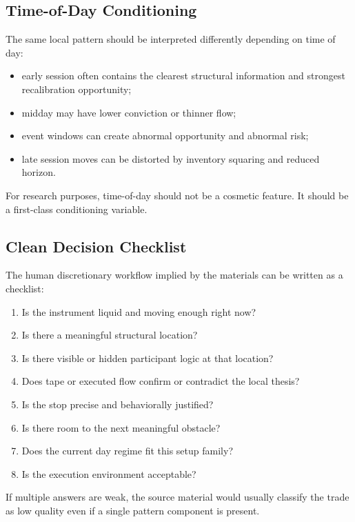 \subsection{Time-of-Day Conditioning}

The same local pattern should be interpreted differently depending on time of day:
\begin{itemize}
  \item early session often contains the clearest structural information and strongest recalibration opportunity;
  \item midday may have lower conviction or thinner flow;
  \item event windows can create abnormal opportunity and abnormal risk;
  \item late session moves can be distorted by inventory squaring and reduced horizon.
\end{itemize}

For research purposes, time-of-day should not be a cosmetic feature.
It should be a first-class conditioning variable.

\subsection{Clean Decision Checklist}

The human discretionary workflow implied by the materials can be written as a checklist:
\begin{enumerate}
  \item Is the instrument liquid and moving enough right now?
  \item Is there a meaningful structural location?
  \item Is there visible or hidden participant logic at that location?
  \item Does tape or executed flow confirm or contradict the local thesis?
  \item Is the stop precise and behaviorally justified?
  \item Is there room to the next meaningful obstacle?
  \item Does the current day regime fit this setup family?
  \item Is the execution environment acceptable?
\end{enumerate}

If multiple answers are weak, the source material would usually classify the trade as low quality even if a single pattern component is present.
